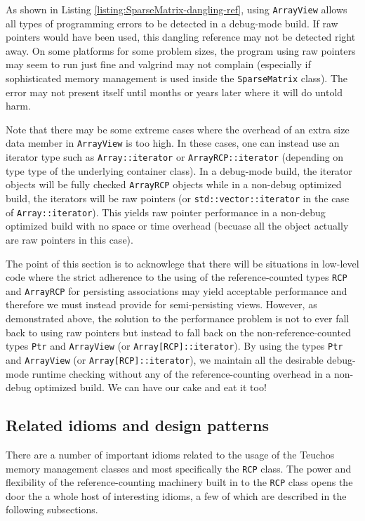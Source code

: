 \documentclass[pdf,ps2pdf,11pt]{SANDreport}
\begin{document}
As shown in Listing {}\ref{listing:SparseMatrix-dangling-ref}, using
{}\texttt{ArrayView} allows all types of programming errors to be
detected in a debug-mode build.  If raw pointers would have been used,
this dangling reference may not be detected right away.  On some
platforms for some problem sizes, the program using raw pointers may
seem to run just fine and valgrind may not complain (especially if
sophisticated memory management is used inside the
{}\texttt{SparseMatrix} class).  The error may not present itself
until months or years later where it will do untold harm.

Note that there may be some extreme cases where the overhead of an
extra size data member in {}\texttt{ArrayView} is too high.  In these
cases, one can instead use an iterator type such as
{}\texttt{Array::iterator} or {}\texttt{ArrayRCP::iterator} (depending
on type type of the underlying container class).  In a debug-mode
build, the iterator objects will be fully checked {}\texttt{ArrayRCP}
objects while in a non-debug optimized build, the iterators will be
raw pointers (or {}\texttt{std::vector::iterator} in the case of
{}\texttt{Array::iterator}).  This yields raw pointer performance in a
non-debug optimized build with no space or time overhead (becuase all
the object actually are raw pointers in this case).

The point of this section is to acknowlege that there will be
situations in low-level code where the strict adherence to the using
of the reference-counted types {}\texttt{RCP} and {}\texttt{ArrayRCP}
for persisting associations may yield acceptable performance and
therefore we must instead provide for semi-persisting views.  However,
as demonstrated above, the solution to the performance problem is not
to ever fall back to using raw pointers but instead to fall back on
the non-reference-counted types {}\texttt{Ptr} and
{}\texttt{ArrayView} (or {}\texttt{Array[RCP]::iterator}).  By using
the types {}\texttt{Ptr} and {}\texttt{ArrayView} (or
{}\texttt{Array[RCP]::iterator}), we maintain all the desirable
debug-mode runtime checking without any of the reference-counting
overhead in a non-debug optimized build.  We can have our cake and eat
it too!


%
{}\subsection{Related idioms and design patterns}
%

There are a number of important idioms related to the usage of the
Teuchos memory management classes and most specifically the
{}\texttt{RCP} class.  The power and flexibility of the
reference-counting machinery built in to the {}\texttt{RCP} class
opens the door the a whole host of interesting idioms, a few of which
are described in the following subsections.
\end{document}
